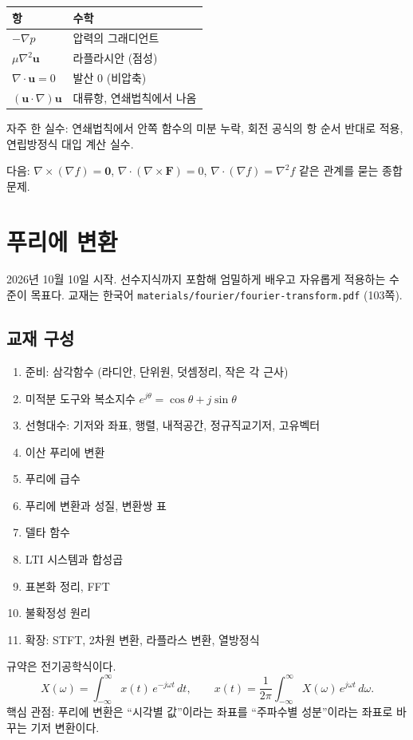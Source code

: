 \documentclass[11pt]{article}
\begin{document}
\begin{center}
\begin{tabular}{ll}
\toprule
항 & 수학\\
\midrule
$-\nabla p$ & 압력의 그래디언트\\
$\mu\nabla^2\mathbf u$ & 라플라시안 (점성)\\
$\nabla\cdot\mathbf u=0$ & 발산 0 (비압축)\\
$(\mathbf u\cdot\nabla)\mathbf u$ & 대류항, 연쇄법칙에서 나옴\\
\bottomrule
\end{tabular}
\end{center}

자주 한 실수: 연쇄법칙에서 안쪽 함수의 미분 누락, 회전 공식의 항 순서 반대로 적용, 연립방정식 대입 계산 실수.

다음: $\nabla\times(\nabla f)=\mathbf 0$, $\nabla\cdot(\nabla\times\mathbf F)=0$, $\nabla\cdot(\nabla f)=\nabla^2 f$ 같은 관계를 묻는 종합 문제.

\section{푸리에 변환}
2026년 10월 10일 시작. 선수지식까지 포함해 엄밀하게 배우고 자유롭게 적용하는 수준이 목표다. 교재는 한국어 \texttt{materials/fourier/fourier-transform.pdf} (103쪽).

\subsection{교재 구성}
\begin{enumerate}[nosep,start=0]
\item 준비: 삼각함수 (라디안, 단위원, 덧셈정리, 작은 각 근사)
\item 미적분 도구와 복소지수 $e^{j\theta}=\cos\theta+j\sin\theta$
\item 선형대수: 기저와 좌표, 행렬, 내적공간, 정규직교기저, 고유벡터
\item 이산 푸리에 변환
\item 푸리에 급수
\item 푸리에 변환과 성질, 변환쌍 표
\item 델타 함수
\item LTI 시스템과 합성곱
\item 표본화 정리, FFT
\item 불확정성 원리
\item 확장: STFT, 2차원 변환, 라플라스 변환, 열방정식
\end{enumerate}
규약은 전기공학식이다.
\[
X(\omega)=\int_{-\infty}^{\infty}x(t)\,e^{-j\omega t}\,dt,\qquad
x(t)=\frac{1}{2\pi}\int_{-\infty}^{\infty}X(\omega)\,e^{j\omega t}\,d\omega.
\]
핵심 관점: 푸리에 변환은 ``시각별 값''이라는 좌표를 ``주파수별 성분''이라는 좌표로 바꾸는 기저 변환이다.
\end{document}

